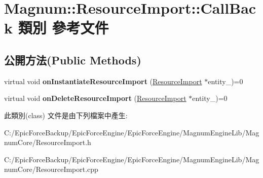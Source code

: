 \hypertarget{class_magnum_1_1_resource_import_1_1_call_back}{}\section{Magnum\+:\+:Resource\+Import\+:\+:Call\+Back 類別 參考文件}
\label{class_magnum_1_1_resource_import_1_1_call_back}
\subsection*{公開方法(Public Methods)}
\begin{DoxyCompactItemize}
\item 
virtual void {\bfseries on\+Instantiate\+Resource\+Import} (\hyperlink{class_magnum_1_1_resource_import}{Resource\+Import} $\ast$entity\+\_\+)=0\hypertarget{class_magnum_1_1_resource_import_1_1_call_back_ae58b23a4bb3518aacb81dcd000ebfa43}{}\label{class_magnum_1_1_resource_import_1_1_call_back_ae58b23a4bb3518aacb81dcd000ebfa43}

\item 
virtual void {\bfseries on\+Delete\+Resource\+Import} (\hyperlink{class_magnum_1_1_resource_import}{Resource\+Import} $\ast$entity\+\_\+)=0\hypertarget{class_magnum_1_1_resource_import_1_1_call_back_a28b3873611f1333489b53d1e2436e32a}{}\label{class_magnum_1_1_resource_import_1_1_call_back_a28b3873611f1333489b53d1e2436e32a}

\end{DoxyCompactItemize}


此類別(class) 文件是由下列檔案中產生\+:\begin{DoxyCompactItemize}
\item 
C\+:/\+Epic\+Force\+Backup/\+Epic\+Force\+Engine/\+Epic\+Force\+Engine/\+Magnum\+Engine\+Lib/\+Magnum\+Core/Resource\+Import.\+h\item 
C\+:/\+Epic\+Force\+Backup/\+Epic\+Force\+Engine/\+Epic\+Force\+Engine/\+Magnum\+Engine\+Lib/\+Magnum\+Core/Resource\+Import.\+cpp\end{DoxyCompactItemize}
